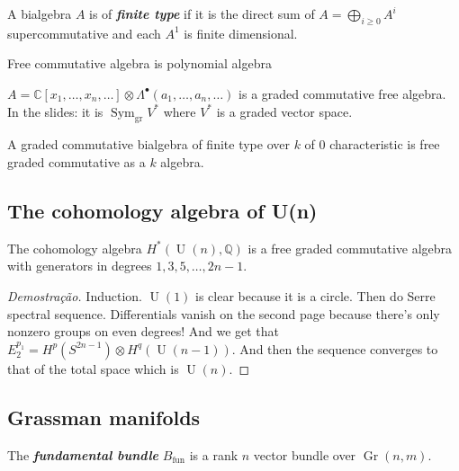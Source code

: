 \begin{defn}
	A bialgebra $A$ is of \textit{\textbf{finite type}} if it is the direct sum of $A=\bigoplus_{i\geq 0} A^i $ supercommutative and each $A^1$ is finite dimensional.
\end{defn}

\begin{remark}
	Free commutative algebra is polynomial algebra
\end{remark}

\begin{defn}
	$A=\mathbb{C}[x_1,\ldots,x_n,\ldots]\otimes \Lambda^\bullet(a_1,\ldots,a_n,\ldots)$ is a graded commutative free algebra. In the slides: it is $\operatorname{Sym}_{\operatorname{gr}}V^*$ where $V^*$ is a graded vector space.
\end{defn}

\begin{thm}[Hopf]\leavevmode
	A graded commutative bialgebra of finite type over $k$ of 0 characteristic is free graded commutative as a $k$ algebra.
\end{thm}

\subsection{The cohomology algebra of U(n)}

\begin{claim}
	The cohomology algebra $H^{*}(\operatorname{U}(n),\mathbb{Q})$ is a free graded commutative algebra with generators in degrees $1,3,5,\ldots,2n-1$.
\end{claim}

\begin{proof}[Demostra\c c\~ao]
	Induction.  $\operatorname{U}(1)$ is clear because it is a circle. Then do Serre spectral sequence. Differentials vanish on the second page because there's only nonzero groups on even degrees! And we get that $E_2^{p_1}=H^{p}(S^{2n-1})\otimes H^{q}(\operatorname{U}(n-1))$. And then the sequence converges to that of the total space which is $\operatorname{U}(n)$.
\end{proof}

\subsection{Grassman manifolds}

\begin{defn}
	The \textit{\textbf{fundamental bundle}} $B_{\operatorname{fun}}$ is a rank $n$ vector bundle over $\operatorname{Gr}(n,m)$.
\end{defn}

